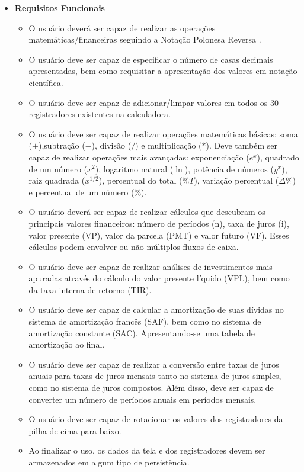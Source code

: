 \begin{itemize}
 \item \textbf{Requisitos Funcionais}
	\begin{itemize}
 	\item O usuário deverá ser capaz de realizar as operações matemáticas/financeiras seguindo a Notação Polonesa Reversa \cite{NPR}.
	\item O usuário deve ser capaz de especificar o número de casas decimais apresentadas, bem como requisitar a apresentação dos valores em notação científica.
	\item O usuário deve ser capaz de adicionar/limpar valores em todos os 30 registradores existentes na calculadora. 
	\item O usuário deve ser capaz de realizar operações matemáticas básicas: soma ($+$),subtração ($-$), divisão ($/$) e multiplicação ($*$). Deve também ser capaz de realizar operações mais avançadas: exponenciação ($ e^{x} $), quadrado de um número ($x^{2}$), logaritmo natural ($\ln$), potência de números ($y^{x}$), raiz quadrada ($x^{1/2}$), percentual do total ($\%T$), variação percentual ($\Delta\%$) e percentual de um número ($\%$).
	\item O usuário deverá ser capaz de realizar cálculos que descubram os principais valores financeiros: número de períodos (n), taxa de juros (i), valor presente (VP), valor da parcela (PMT) e valor futuro (VF). Esses cálculos podem envolver ou não múltiplos fluxos de caixa.
	\item O usuário deve ser capaz de realizar análises de investimentos mais apuradas através do cálculo do valor presente líquido (VPL), bem como da taxa interna de retorno (TIR).
	\item O usuário deve ser capaz de calcular a amortização de suas dívidas no sistema de amortização francês (SAF), bem como no sistema de amortização constante (SAC). Apresentando-se uma tabela de amortização ao final.
	\item O usuário deve ser capaz de realizar a conversão entre taxas de juros anuais para taxas de juros mensais tanto no sistema de juros simples, como no sistema de juros compostos. Além disso, deve ser capaz de converter um número de períodos anuais em períodos mensais.
	\item O usuário deve ser capaz de rotacionar os valores dos registradores da pilha de cima para baixo.
	\item Ao finalizar o uso, os dados da tela e dos registradores devem ser armazenados em algum tipo de persistência.
	

\end{itemize}
\end{itemize}
